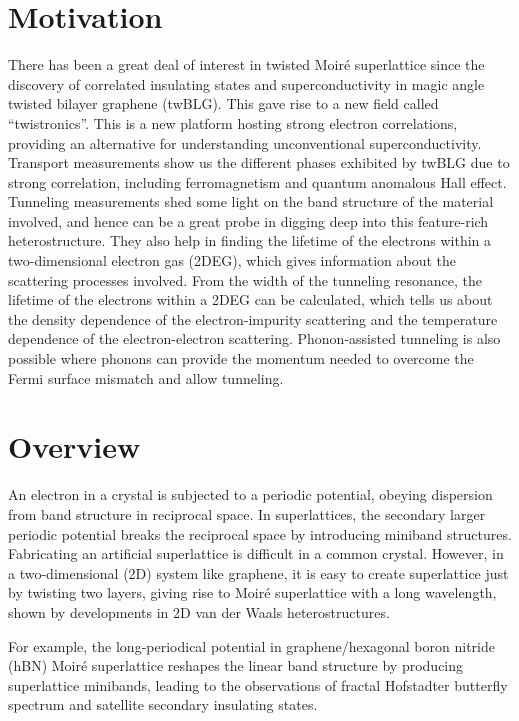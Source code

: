 \section{Motivation}

There has been a great deal of interest in twisted Moiré superlattice since the discovery of correlated insulating states and superconductivity in magic angle twisted bilayer graphene (twBLG). \cite{Cao2018} \cite{Cao2018_2} This gave rise to a new field called “twistronics”. \cite{Ribeiro-Palau690} This is a new platform hosting strong electron correlations, providing an alternative for understanding unconventional superconductivity. Transport measurements show us the different phases exhibited by twBLG due to strong correlation, including ferromagnetism and quantum anomalous Hall effect. \cite{Serlin900,Sharpe605} Tunneling measurements shed some light on the band structure of the material involved, and hence can be a great probe in digging deep into this feature-rich heterostructure. \cite{Mishchenko2014} They also help in finding the lifetime of the electrons within a two-dimensional electron gas (2DEG), which gives information about the scattering processes involved. \cite{Ritchie} From the width of the tunneling resonance, the lifetime of the electrons within a 2DEG can be calculated, which tells us about the density dependence of the electron-impurity scattering and the temperature dependence of the electron-electron scattering. Phonon-assisted tunneling is also possible where phonons can provide the momentum needed to overcome the Fermi surface mismatch and allow tunneling. \cite{Chandni}

\section{Overview}

An electron in a crystal is subjected to a periodic potential, obeying dispersion from band structure in reciprocal space. In superlattices, the secondary larger periodic potential breaks the reciprocal space by introducing miniband structures. Fabricating an artificial superlattice is difficult in a common crystal. However, in a two-dimensional (2D) system like graphene, it is easy to create superlattice just by twisting two layers, \cite{Hunt1427,Yankowitz2012,Dean2013,Ponomarenko2013,Yang2013,Schmidt2014} giving rise to Moiré superlattice with a long wavelength, shown by developments in 2D van der Waals heterostructures. \cite{Geim2013}

For example, the long-periodical potential in graphene/hexagonal boron nitride (hBN) Moiré superlattice reshapes
the linear band structure by producing superlattice minibands, leading to the observations of fractal Hofstadter butterfly spectrum and satellite secondary insulating states. \cite{Iwasaki2020}

